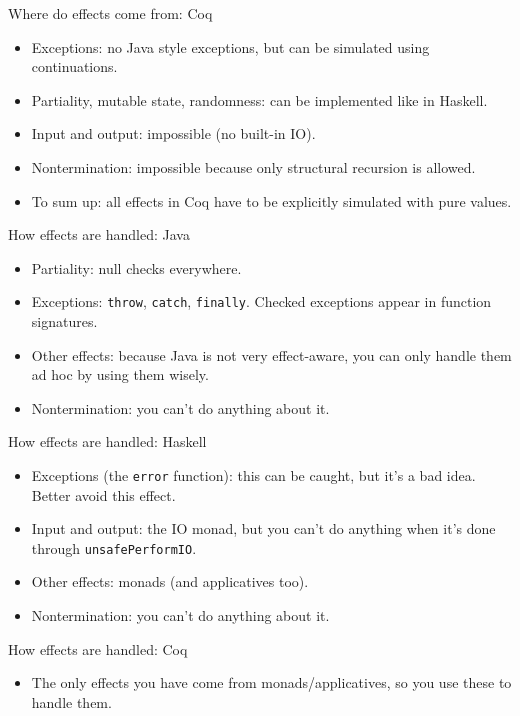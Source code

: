 \documentclass{beamer}
\begin{document}
\begin{frame}{Where do effects come from: Coq}
\begin{itemize}
	\item Exceptions: no Java style exceptions, but can be simulated using continuations.
	\item Partiality, mutable state, randomness: can be implemented like in Haskell.
	\item Input and output: impossible (no built-in IO).
	\item Nontermination: impossible because only structural recursion is allowed.
	\item To sum up: all effects in Coq have to be explicitly simulated with pure values.
\end{itemize}
\end{frame}

\begin{frame}{How effects are handled: Java}
\begin{itemize}
	\item Partiality: null checks everywhere.
	\item Exceptions: \texttt{throw}, \texttt{catch}, \texttt{finally}. Checked exceptions appear in function signatures.
	\item Other effects: because Java is not very effect-aware, you can only handle them ad hoc by using them wisely.
	\item Nontermination: you can't do anything about it.
\end{itemize}
\end{frame}

\begin{frame}{How effects are handled: Haskell}
\begin{itemize}
	\item Exceptions (the \texttt{error} function): this can be caught, but it's a bad idea. Better avoid this effect.
	\item Input and output: the IO monad, but you can't do anything when it's done through \texttt{unsafePerformIO}.
	\item Other effects: monads (and applicatives too).
	\item Nontermination: you can't do anything about it.
\end{itemize}
\end{frame}

\begin{frame}{How effects are handled: Coq}
\begin{itemize}
	\item The only effects you have come from monads/applicatives, so you use these to handle them.
\end{itemize}
\end{frame}
\end{document}
